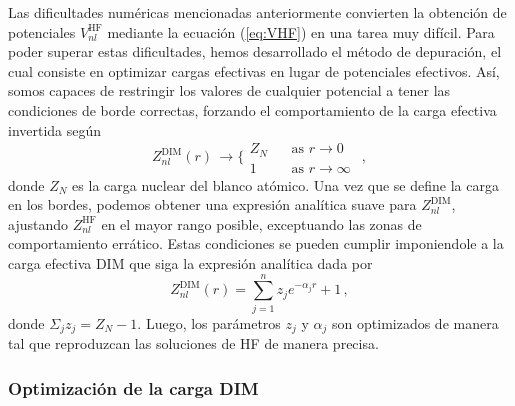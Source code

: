 Las dificultades numéricas mencionadas anteriormente convierten la 
obtención de potenciales $V_{nl}^{\mathrm{HF}}$ mediante la ecuación 
(\ref{eq:VHF}) en una tarea muy difícil. Para poder superar estas 
dificultades, hemos desarrollado el método de depuración, el cual 
consiste en optimizar cargas efectivas en lugar de potenciales efectivos. 
Así, somos capaces de restringir los valores de cualquier potencial a 
tener las condiciones de borde correctas, forzando el comportamiento de 
la carga efectiva invertida según
\begin{equation}
Z_{nl}^{\mathrm{DIM}}(r) \, \rightarrow 
\bigg\{ 
\begin{array}{ll}
Z_{N}  \ \  & \ \ \text{as\ \ }r  \rightarrow 0\  \\ 
1           & \ \ \text{as\ \ }r  \rightarrow \infty \ 
\end{array}\,,
\label{eq:Zasympt}
\end{equation}
donde $Z_N$ es la carga nuclear del blanco atómico. Una vez que se 
define la carga en los bordes, podemos obtener una expresión analítica
suave para $Z_{nl}^{\mathrm{DIM}}$, ajustando $Z_{nl}^{\mathrm{HF}}$ en
el mayor rango posible, exceptuando las zonas de comportamiento errático.
Estas condiciones se pueden cumplir imponiendole a la carga efectiva 
DIM que siga la expresión analítica dada por
\begin{equation}
Z_{nl}^{\mathrm{DIM}}(r)= \sum_{j=1}^{n} z_j e^{-\alpha_j r}+1 \,,
\label{eq:atomzDIM}
\end{equation}
donde $\Sigma_j z_j=Z_N-1$. Luego, los parámetros $z_j$ y $\alpha_j$ 
son optimizados de manera tal que reproduzcan las soluciones de HF de 
manera precisa.

\subsubsection{Optimización de la carga DIM}
\label{subsec:optDIM}

